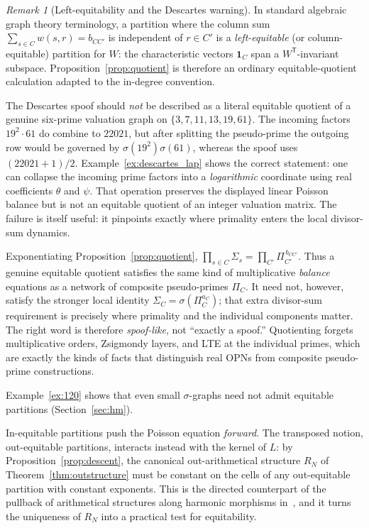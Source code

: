 \documentclass[11pt]{article}
\theoremstyle{definition}
\theoremstyle{remark}
\newtheorem{remark}[theorem]{Remark}
\newcommand{\one}{\mathbf{1}}
\begin{document}
\begin{remark}[Left-equitability and the Descartes warning]\label{rem:left_eq}
In standard algebraic graph theory terminology, a partition where the column
sum $\sum_{s\in C}w(s,r)=b_{CC'}$ is independent of $r\in C'$ is a
\emph{left-equitable} (or column-equitable) partition for $W$: the
characteristic vectors $\one_C$ span a $W^{\mathsf T}$-invariant subspace.
Proposition~\ref{prop:quotient} is therefore an ordinary equitable-quotient
calculation adapted to the in-degree convention.

The Descartes spoof should \emph{not} be described as a literal equitable
quotient of a genuine six-prime valuation graph on
$\{3,7,11,13,19,61\}$.  The incoming factors $19^2\cdot61$ do combine to
$22021$, but after splitting the pseudo-prime the outgoing row would be
governed by $\sigma(19^2)\sigma(61)$, whereas the spoof uses
$(22021+1)/2$.  Example~\ref{ex:descartes_lap} shows the correct statement:
one can collapse the incoming prime factors into a \emph{logarithmic}
coordinate using real coefficients $\theta$ and $\psi$.  That operation
preserves the displayed linear Poisson balance but is not an equitable
quotient of an integer valuation matrix.  The failure is itself useful: it
pinpoints exactly where primality enters the local divisor-sum dynamics.
\end{remark}

Exponentiating Proposition~\ref{prop:quotient},
$\prod_{s\in C}\Sigma_s=\prod_{C'}\Pi_{C'}^{\,b_{CC'}}$.
Thus a genuine equitable quotient satisfies the same kind of multiplicative
\emph{balance} equations as a network of composite pseudo-primes $\Pi_C$.
It need not, however, satisfy the stronger local identity
$\Sigma_C=\sigma(\Pi_C^{a_C})$; that extra divisor-sum requirement is
precisely where primality and the individual components matter.  The right
word is therefore \emph{spoof-like}, not ``exactly a spoof.''  Quotienting
forgets multiplicative orders, Zsigmondy layers, and LTE at the individual
primes, which are exactly the kinds of facts that distinguish real OPNs from
composite pseudo-prime constructions.

Example~\ref{ex:120} shows that even small $\sigma$-graphs need not admit
equitable partitions (Section~\ref{sec:hm}).

In-equitable partitions push the Poisson equation \emph{forward}.  The
transposed notion, out-equitable partitions, interacts instead with the
kernel of $L$: by Proposition~\ref{prop:descent}, the canonical
out-arithmetical structure $R_N$ of Theorem~\ref{thm:outstructure} must be
constant on the cells of any out-equitable partition with constant
exponents.  This is the directed counterpart of the pullback of
arithmetical structures along harmonic morphisms in~\cite{MJappl}, and it
turns the uniqueness of $R_N$ into a practical test for equitability.
\end{document}
